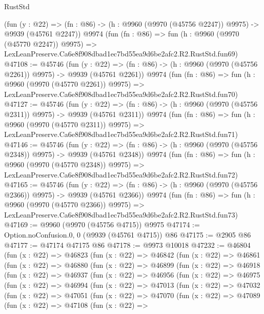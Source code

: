 \begin{lexlean}{RustStd}
\begin{coremodule}
    (fun (y : @22) =>
    (fn : @86) -> (h : @9960 (@9970 (@45756 @2247)) @9975) -> @9939 (@45761 @2247))
    @9974
    (fun (fn : @86) =>
    fun (h : @9960 (@9970 (@45770 @2247)) @9975) =>
    LexLeanPreserve.Ca6e8f908dbad1ec7bd55ea9d6be2afc2.R2.RustStd.fun69)
@47108 := @45746
    (fun (y : @22) =>
    (fn : @86) -> (h : @9960 (@9970 (@45756 @2261)) @9975) -> @9939 (@45761 @2261))
    @9974
    (fun (fn : @86) =>
    fun (h : @9960 (@9970 (@45770 @2261)) @9975) =>
    LexLeanPreserve.Ca6e8f908dbad1ec7bd55ea9d6be2afc2.R2.RustStd.fun70)
@47127 := @45746
    (fun (y : @22) =>
    (fn : @86) -> (h : @9960 (@9970 (@45756 @2311)) @9975) -> @9939 (@45761 @2311))
    @9974
    (fun (fn : @86) =>
    fun (h : @9960 (@9970 (@45770 @2311)) @9975) =>
    LexLeanPreserve.Ca6e8f908dbad1ec7bd55ea9d6be2afc2.R2.RustStd.fun71)
@47146 := @45746
    (fun (y : @22) =>
    (fn : @86) -> (h : @9960 (@9970 (@45756 @2348)) @9975) -> @9939 (@45761 @2348))
    @9974
    (fun (fn : @86) =>
    fun (h : @9960 (@9970 (@45770 @2348)) @9975) =>
    LexLeanPreserve.Ca6e8f908dbad1ec7bd55ea9d6be2afc2.R2.RustStd.fun72)
@47165 := @45746
    (fun (y : @22) =>
    (fn : @86) -> (h : @9960 (@9970 (@45756 @2366)) @9975) -> @9939 (@45761 @2366))
    @9974
    (fun (fn : @86) =>
    fun (h : @9960 (@9970 (@45770 @2366)) @9975) =>
    LexLeanPreserve.Ca6e8f908dbad1ec7bd55ea9d6be2afc2.R2.RustStd.fun73)
@47169 := @9960 (@9970 (@45756 @4715)) @9975
@47174 := Option.noConfusion.{0, 0} (@9939 (@45761 @4715)) @86
@47175 := @2905 @86
@47177 := @47174 @47175 @86
@47178 := @9973 @10018
@47232 := @46804
    (fun (x : @22) =>
    @46823
      (fun (x : @22) =>
      @46842
        (fun (x : @22) =>
        @46861
          (fun (x : @22) =>
          @46880
            (fun (x : @22) =>
            @46899
              (fun (x : @22) =>
              @46918
                (fun (x : @22) =>
                @46937
                  (fun (x : @22) =>
                  @46956
                    (fun (x : @22) =>
                    @46975
                      (fun (x : @22) =>
                      @46994
                        (fun (x : @22) =>
                        @47013
                          (fun (x : @22) =>
                          @47032
                            (fun (x : @22) =>
                            @47051
                              (fun (x : @22) =>
                              @47070
                                (fun (x : @22) =>
                                @47089
                                  (fun (x : @22) =>
                                  @47108
                                    (fun (x : @22) =>

\end{coremodule}
\end{lexlean}
